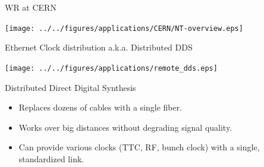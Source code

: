 \documentclass[compress,red]{beamer}
\begin{document}
\begin{frame}{WR at CERN}

    \begin{center}
      \texttt{[image: ../../figures/applications/CERN/NT-overview.eps]}
    \end{center}

\end{frame}
\begin{frame}{Ethernet Clock distribution a.k.a. Distributed DDS}
  \begin{center}
    \texttt{[image: ../../figures/applications/remote\_dds.eps]}
  \end{center}
  \begin{block}{Distributed Direct Digital Synthesis}
    \begin{itemize}
    \item Replaces dozens of cables with a single fiber.
    \item Works over big distances without degrading signal quality.
    \item Can provide various clocks (TTC, RF, bunch clock) with a single, standardized link.
    \end{itemize}
  \end{block}
\end{frame}
\end{document}
